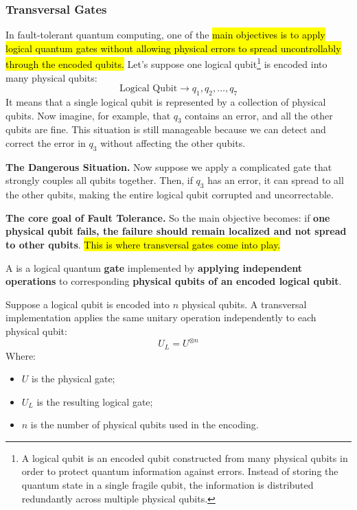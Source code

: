 \subsubsection{Transversal Gates}\label{sec:transversal-gates}

In fault-tolerant quantum computing, one of the \hl{main objectives is to apply logical quantum gates without allowing physical errors to spread uncontrollably through the encoded qubits.} Let's suppose one logical qubit\footnote{A logical qubit is an encoded qubit constructed from many physical qubits in order to protect quantum information against errors. Instead of storing the quantum state in a single fragile qubit, the information is distributed redundantly across multiple physical qubits.} is encoded into many physical qubits:
\begin{equation*}
    \text{Logical Qubit} \rightarrow q_1, q_2, \ldots, q_7
\end{equation*}
It means that a single logical qubit is represented by a collection of physical qubits. Now imagine, for example, that $q_3$ contains an error, and all the other qubits are fine. This situation is still manageable because we can detect and correct the error in $q_3$ without affecting the other qubits.

\highspace
\textcolor{Red2}{ \textbf{The Dangerous Situation.}} Now suppose we apply a complicated gate that strongly couples all qubits together. Then, if $q_3$ has an error, it can spread to all the other qubits, making the entire logical qubit corrupted and uncorrectable.

\highspace
\textcolor{Green3}{ \textbf{The core goal of Fault Tolerance.}} So the main objective becomes: if \textbf{one physical qubit fails, the failure should remain localized and not spread to other qubits}. \hl{This is where transversal gates come into play.}

\highspace
\begin{definitionbox}
    A  is a logical quantum \textbf{gate} implemented by \textbf{applying independent operations} to corresponding \textbf{physical qubits of an encoded logical qubit}.

    \highspace
    Suppose a logical qubit is encoded into $n$ physical qubits. A transversal implementation applies the same unitary operation independently to each physical qubit:
    \begin{equation*}
        U_L = U^{\otimes n}
    \end{equation*}
    Where:
    \begin{itemize}
        \item $U$ is the physical gate;
        \item $U_L$ is the resulting logical gate;
        \item $n$ is the number of physical qubits used in the encoding.
    \end{itemize}
\end{definitionbox}

